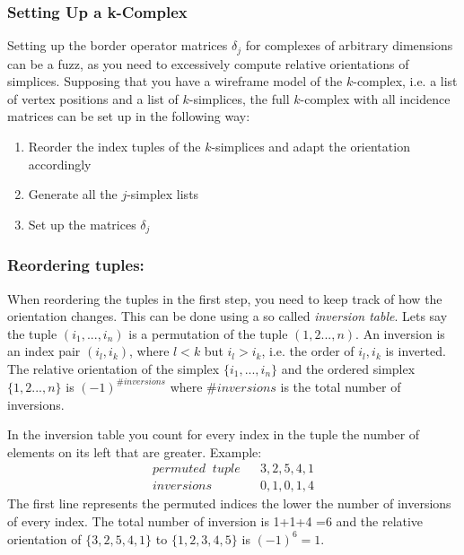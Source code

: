\subsubsection{Setting Up a k-Complex}
Setting up the border operator matrices $\delta_j$ for complexes of arbitrary dimensions can be a fuzz, as you need to excessively compute relative orientations of simplices. Supposing that you have a wireframe model of the $k$-complex, i.e. a list of vertex positions and a list of $k$-simplices, the full $k$-complex  with all incidence matrices can be set up in the following way:
\begin{enumerate}
	\item Reorder the index tuples of the $k$-simplices and adapt the orientation accordingly
	\item Generate all the $j$-simplex lists
	\item Set up the matrices $\delta_j$
\end{enumerate}



\subsubsection{Reordering tuples: } When reordering the tuples in the first step, you need to keep track of how the orientation changes. This can be done using a so called \emph{inversion table}. Lets say the tuple $(i_1,...,i_n)$ is a permutation of the tuple $(1,2...,n)$. An inversion is an index pair $(i_l,i_k)$, where $l<k$ but $i_l >i_k$, i.e. the order of $i_l,i_k$ is inverted. The relative orientation of the simplex $\{i_1,...,i_n\}$ and the ordered simplex $\{1,2...,n\}$ is $(-1)^{\#inversions}$ where $\#inversions$ is the total number of inversions.

In the inversion table you count for every index in the tuple the number of elements on its left that are greater. Example: 
\begin{align*}
permuted \;\; tuple & &3,2,5,4,1 \\
inversions & & 0,1,0,1,4
\end{align*}
The first line represents the permuted indices the lower the number of inversions of every index. The total number of inversion is  1+1+4 =6 and the relative orientation of
$\{3,2,5,4,1\}$ to $\{1,2,3,4,5\}$ is $(-1)^6 = 1$.

